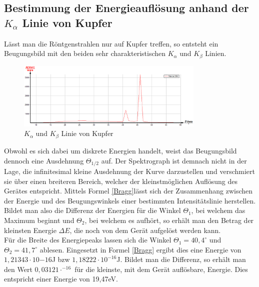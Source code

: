 \subsection{Bestimmung der Energieauflösung anhand der $K_\alpha$ Linie von Kupfer}
Lässt man die Röntgenstrahlen nur auf Kupfer treffen, so entsteht ein Beugungsbild mit den beiden sehr charakteristischen $K_\alpha$ und $K_\beta$ Linien. 
\begin{figure}[htbp]
\includegraphics[width=0.8\textwidth] {pics/kupfer_ab.png}
\centering
\caption{$K_\alpha \text{ und } K_\beta$ Linie von Kupfer}
\label{Aufbau}
\end{figure}

Obwohl es sich dabei um diskrete Energien handelt, weist das Beugungsbild dennoch eine Ausdehnung $\Theta_{1/2}$ auf. Der Spektrograph ist demnach nicht in der Lage, die infinitesimal kleine Ausdehnung der Kurve darzustellen und verschmiert sie über einen breiteren Bereich, welcher der kleinstmöglichen Auflösung des Gerätes entspricht.
Mittels Formel \ref{Bragg}lässt sich der Zusammenhang zwischen der Energie und des Beugungswinkels einer bestimmten Intensitätslinie herstellen.  
Bildet man also die Differenz der Energien für die Winkel $\Theta_1$, bei welchem das Maximum beginnt und $\Theta_2$, bei welchem es aufhört, so erhält man den Betrag der kleinsten Energie $\Delta E$, die noch von dem Gerät aufgelöst werden kann.\\
Für die Breite des Energiepeaks lassen sich die Winkel $\Theta_1 = 40,4^\circ$ und $\Theta_2 = 41,7^\circ$ ablesen. Eingesetzt in Formel \ref{Bragg} ergibt dies eine Energie von $1,21343\cdot10{-16}$J bzw $1,18222\cdot10^{-16}$J. Bildet man die Differenz, so erhält man den Wert $0,03121\cdot^{-16}$ für die kleinste, mit dem Gerät auflösbare, Energie. Dies entspricht einer Energie von 19,47eV.
 
